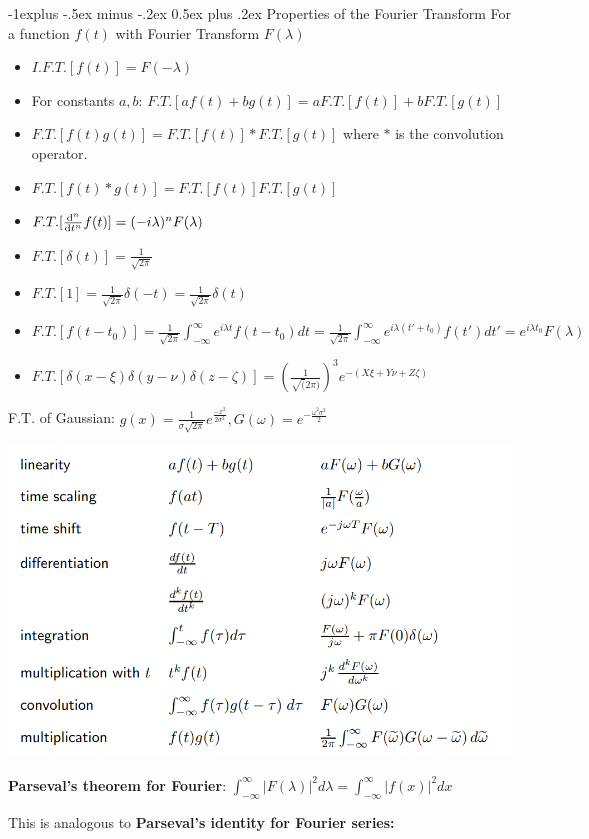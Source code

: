 \documentclass{article}
\makeatletter
\theoremstyle{definition}
\renewcommand{\subsection}{\@startsection{subsection}{2}{0mm}%
	{-1explus -.5ex minus -.2ex}%
	{0.5ex plus .2ex}%
	{\normalfont\normalsize\bfseries}}
\makeatother
\begin{document}
\begin{multicols}{3}
\subsection{Properties of the Fourier Transform}
For a function $f(t)$ with Fourier Transform $F(\lambda)$
\begin{itemize}
	\item $I.F.T.[f(t)] = F(-\lambda)$
	\item For constants $a,b$: $F.T.[af(t)+bg(t)] = a F.T.[f(t)] + b F.T.[g(t)] $
	\item $F.T.[f(t)g(t)] = F.T.[f(t)] * F.T.[g(t)]$  where $*$ is the convolution operator.
	\item $F.T.[f(t) * g(t)] = F.T.[f(t)] F.T.[g(t)]$
	\item $F.T.[\dv{^n}{t^n} f(t)] = (-i\lambda)^n F(\lambda)$
	\item $F.T.[\delta(t)] = \frac{1}{\sqrt{2\pi}}$
	\item $F.T.[1] = \frac{1}{\sqrt{2\pi}}\delta(-t) = \frac{1}{\sqrt{2\pi}}\delta(t)$
	\item $F.T.[f(t-t_0)] = \frac{1}{\sqrt{2\pi}}  \int_{-\infty}^\infty e^{i \lambda t} f(t-t_0) dt = \frac{1}{\sqrt{2\pi}}  \int_{-\infty}^\infty e^{i \lambda (t'+t_0)} f(t') dt' = e^{i \lambda t_0} F(\lambda)$
	\item $F.T.[\delta(x-\xi)\delta(y-\nu)\delta(z-\zeta)] = \left(\frac{1}{\sqrt(2 \pi)}\right)^3 e^{-(X\xi + Y\nu + Z \zeta)}$
\end{itemize}

F.T. of Gaussian:
$g(x) = \frac{1}{\sigma \sqrt{2 \pi}} e^{\frac{-x^2}{2\sigma^2}}, G(\omega) = e^{-\frac{\omega^2 \sigma^2}{2}}$

\includegraphics[width=0.7\linewidth]{common_fourier}

\textbf{Parseval's theorem for Fourier}:
$\int_{-\infty}^{\infty} |F(\lambda)|^2 d\lambda =  \int_{-\infty}^{\infty} |f(x)|^2dx $

This is analogous to \textbf{Parseval's identity for Fourier series:}


\end{multicols}
\end{document}

